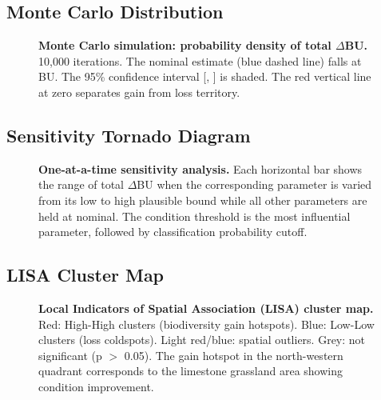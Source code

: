 \subsection{Monte Carlo Distribution}

\begin{figure}[H]
\centering
{}
\caption[Monte Carlo delta distribution with annotations.]{%
\textbf{Monte Carlo simulation: probability density of total $\Delta$BU.} 10,000 iterations. The nominal estimate (blue dashed line) falls at  BU. The 95\% confidence interval [, ] is shaded. The red vertical line at zero separates gain from loss territory.%
}
\label{fig:cat-mc-full}
\end{figure}

\subsection{Sensitivity Tornado Diagram}

\begin{figure}[H]
\centering
{}
\caption[Sensitivity analysis tornado diagram.]{%
\textbf{One-at-a-time sensitivity analysis.} Each horizontal bar shows the range of total $\Delta$BU when the corresponding parameter is varied from its low to high plausible bound while all other parameters are held at nominal. The condition threshold is the most influential parameter, followed by classification probability cutoff.%
}
\label{fig:cat-tornado}
\end{figure}

\subsection{LISA Cluster Map}

\begin{figure}[H]
\centering
{}
\caption[LISA spatial autocorrelation cluster map.]{%
\textbf{Local Indicators of Spatial Association (LISA) cluster map.} Red: High-High clusters (biodiversity gain hotspots). Blue: Low-Low clusters (loss coldspots). Light red/blue: spatial outliers. Grey: not significant (p $>$ 0.05). The gain hotspot in the north-western quadrant corresponds to the limestone grassland area showing condition improvement.%
}
\label{fig:cat-lisa}
\end{figure}


